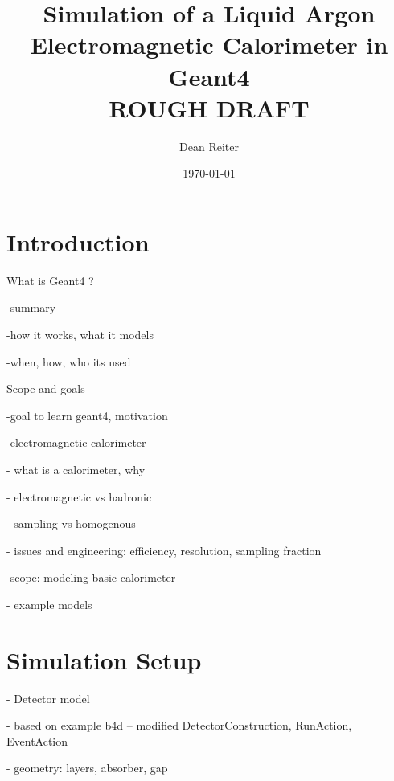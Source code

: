 \documentclass[%
 reprint,
 amsmath,amssymb,
 aps,
]{revtex4-2}
\begin{document}

\title{Simulation of a Liquid Argon Electromagnetic Calorimeter in Geant4\\ROUGH DRAFT}%

\author{Dean Reiter}
%

\date{\today}%

\begin{abstract}


\end{abstract}


\maketitle



\section{Introduction}

What is Geant4 ?

-summary

-how it works, what it models


-when, how, who its used

Scope and goals

-goal to learn geant4, motivation

-electromagnetic calorimeter 

    - what is a calorimeter, why

    - electromagnetic vs hadronic

    - sampling vs homogenous

    - issues and engineering: efficiency, resolution, sampling fraction

-scope: modeling basic calorimeter

    - example models

\section{Simulation Setup}

- Detector model

    - based on example b4d -- modified DetectorConstruction, RunAction, EventAction

    - geometry: layers, absorber, gap
\end{document}

